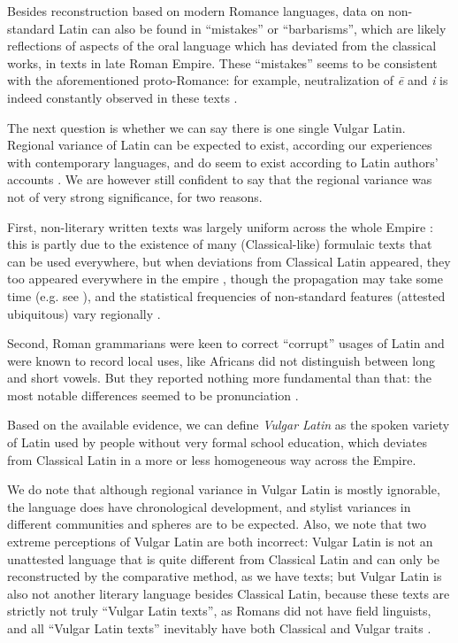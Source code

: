 \documentclass[a4paper, oneside, 12pt]{report}
\newcommand*{\citepage}[1]{p.~{#1}}
\newcommand*{\citepages}[1]{pp.~{#1}}
\newcommand*{\term}[1]{\emph{#1}}
\newcommand{\form}[1]{\emph{#1}}
\begin{document}
Besides reconstruction based on modern Romance languages,
data on non-standard Latin can also be found in
``mistakes'' or ``barbarisms'', 
which are likely reflections of aspects of the oral language 
which has deviated from the classical works, 
in texts in late Roman Empire.
These ``mistakes'' seems to be consistent with the aforementioned proto-Romance:
for example, neutralization of \form{\={e}} and \form{i} is indeed constantly observed in these texts
\citep[\citepage{4}]{herman2010vulgar}.

The next question is whether we can say there is one single Vulgar Latin.
Regional variance of Latin can be expected to exist,
according our experiences with contemporary languages,
and do seem to exist according to Latin authors' accounts
\citep[\citepage{116}]{herman2010vulgar}.
We are however still confident to say that the regional variance 
was not of very strong significance, for two reasons.

First, non-literary written texts was largely uniform across the whole Empire
\citep[\citepage{117}]{herman2010vulgar}:
this is partly due to the existence of 
many (Classical-like) formulaic texts that can be used everywhere,
but when deviations from Classical Latin appeared,
they too appeared everywhere in the empire
\citep[\citepage{235}]{clackson2011blackwell},
though the propagation may take some time
(e.g. see ),
and the statistical frequencies of non-standard features (attested ubiquitous) vary regionally
\citep[\citepage{118}]{herman2010vulgar}.

Second, Roman grammarians were keen to correct ``corrupt'' usages of Latin 
and were known to record local uses, 
like Africans did not distinguish between long and short vowels.
But they reported nothing more fundamental than that:
the most notable differences seemed to be pronunciation
\citep[\citepage{118}]{herman2010vulgar}.

Based on the available evidence,
we can define \term{Vulgar Latin} as the spoken variety of Latin
used by people without very formal school education,
which deviates from Classical Latin in a more or less homogeneous way across the Empire.

We do note that although regional variance in Vulgar Latin is mostly ignorable,
the language does have chronological development, 
and stylist variances in different communities and spheres are to be expected.
Also, we note that two extreme perceptions of Vulgar Latin are both incorrect: 
Vulgar Latin is not an unattested language
that is quite different from Classical Latin and can only be reconstructed by the comparative method,
as we have texts;
but Vulgar Latin is also not another literary language besides Classical Latin, 
because these texts are strictly not truly ``Vulgar Latin texts'',
as Romans did not have field linguists,
and all ``Vulgar Latin texts'' inevitably have both Classical and Vulgar traits
\citep[\citepages{8,26}]{herman2010vulgar}.
\end{document}
